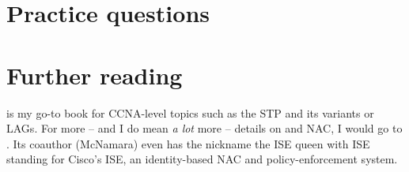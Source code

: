 \section{Practice questions}
\label{sec:ethernet-practice-questions}

\section{Further reading}
\textcite{lammle-ccna} is my go-to book for \acs{CCNA}-level topics such as the \acf{STP} and its variants or \acfp{LAG}.
For more -- and I do mean \emph{a lot} more -- details on  and \acf{NAC}, I would go to \textcite{woland}.
Its coauthor (McNamara) even has the nickname the \acs{ISE} queen with \acs{ISE} standing for Cisco's \acl{ISE}, an identity-based \acs{NAC} and policy-enforcement system.
